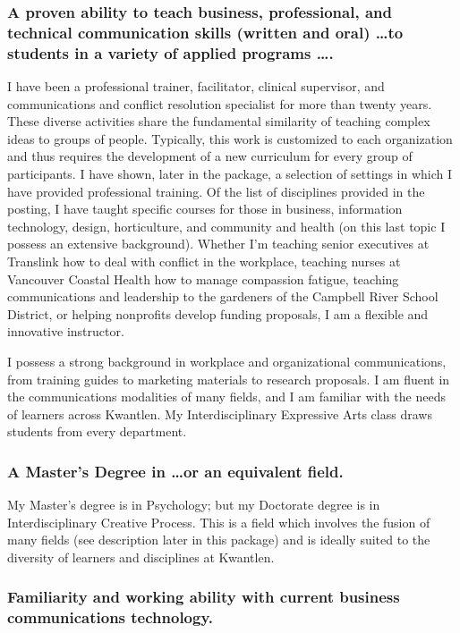 \documentclass[10pt,DIV09,letterpaper,oneside,headsepline]{scrreprt}
\begin{document}
\subsubsection{A proven ability to teach business, professional, and technical communication skills (written and oral) \ldots to students in a variety of applied programs \ldots.}

I have been a professional trainer, facilitator, clinical supervisor, and communications and conflict resolution specialist for more than twenty years. These diverse activities share the fundamental similarity of teaching complex ideas to groups of people. Typically, this work is customized to each organization and thus requires the development of a new curriculum for every group of participants. I have shown, later in the package, a selection of settings in which I have provided professional training. Of the list of disciplines provided in the posting, I have taught specific courses for those in business, information technology, design, horticulture, and community and health (on this last topic I possess an extensive background). Whether I'm teaching senior executives at Translink how to deal with conflict in the workplace, teaching nurses at Vancouver Coastal Health how to manage compassion fatigue, teaching communications and leadership to the gardeners of the Campbell River School District, or helping nonprofits develop funding proposals, I am a flexible and innovative instructor.

I possess a strong background in workplace and organizational communications, from training guides to marketing materials to research proposals. I am fluent in the communications modalities of many fields, and I am familiar with the needs of learners across Kwantlen. My Interdisciplinary Expressive Arts class draws students from every department.

\subsubsection{A Master’s Degree in \ldots or an equivalent field.}My Master's degree is in Psychology; but my Doctorate degree is in Interdisciplinary Creative Process. This is a field which involves the fusion of many fields (see description later in this package) and is ideally suited to the diversity of learners and disciplines at Kwantlen.

\subsubsection{Familiarity and working ability with current business communications technology.}
\end{document}
